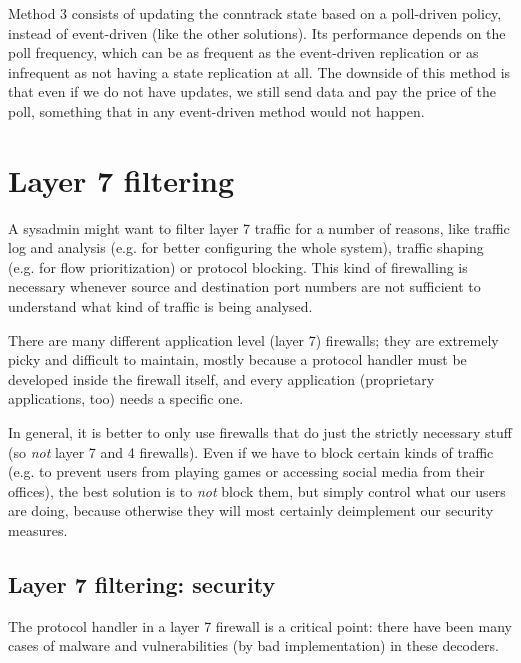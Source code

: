 Method 3 consists of updating the conntrack state based on a poll-driven policy, instead of event-driven (like the other solutions). Its performance depends on the poll frequency, which can be as frequent as the event-driven replication or as infrequent as not having a state replication at all. The downside of this method is that even if we do not have updates, we still send data and pay the price of the poll, something that in any event-driven method would not happen.


\section{Layer 7 filtering}
A sysadmin might want to filter layer 7 traffic for a number of reasons, like traffic log and analysis (e.g. for better configuring the whole system), traffic shaping (e.g. for flow prioritization) or protocol blocking. This kind of firewalling is necessary whenever source and destination port numbers are not sufficient to understand what kind of traffic is being analysed.

There are many different application level (layer 7) firewalls; they are extremely picky and difficult to maintain, mostly because a protocol handler must be developed inside the firewall itself, and every application (proprietary applications, too) needs a specific one.

In general, it is better to only use firewalls that do just the strictly necessary stuff (so \textit{not} layer 7 and 4 firewalls). Even if we have to block certain kinds of traffic (e.g. to prevent users from playing games or accessing social media from their offices), the best solution is to \textit{not} block them, but simply control what our users are doing, because otherwise they will most certainly deimplement our security measures.


\subsection{Layer 7 filtering: security}
The protocol handler in a layer 7 firewall is a critical point: there have been many cases of malware and vulnerabilities (by bad implementation) in these decoders.

\vspace{0.5em}

